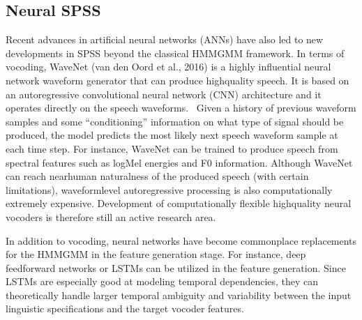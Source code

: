 \documentclass[letterpaper,10pt,english]{jupyterBook}
\begin{document}
\subsection{Neural SPSS}
\label{\detokenize{Synthesis/Statistical_parametric_speech_synthesis:neural-spss}}
\sphinxAtStartPar
Recent advances in artificial neural networks (ANNs) have also led to
new developments in SPSS beyond the classical HMM\sphinxhyphen{}GMM framework. In
terms of vocoding, WaveNet (van den Oord et al., 2016) is a highly
influential neural network waveform generator that can produce
high\sphinxhyphen{}quality speech. It is based on an autoregressive convolutional
neural network (CNN) architecture and it operates directly on the speech
waveforms.  Given a history of previous waveform samples and some
“conditioning” information on what type of signal should be produced,
the model predicts the most likely next speech waveform sample at each
time step. For instance, WaveNet can be trained to produce speech from
spectral features such as log\sphinxhyphen{}Mel energies and F0 information. Although
WaveNet can reach near\sphinxhyphen{}human naturalness of the produced speech (with
certain limitations), waveform\sphinxhyphen{}level autoregressive processing is also
computationally extremely expensive. Development of computationally
flexible high\sphinxhyphen{}quality neural vocoders is therefore still an active
research area.

\sphinxAtStartPar
In addition to vocoding, neural networks have become commonplace
replacements for the HMM\sphinxhyphen{}GMM in the feature generation stage. For
instance, deep feed\sphinxhyphen{}forward networks or LSTMs can be utilized in the
feature generation. Since LSTMs are especially good at modeling temporal
dependencies, they can theoretically handle larger temporal ambiguity
and variability between the input linguistic specifications and the
target vocoder features.
\end{document}

